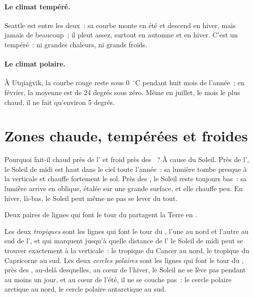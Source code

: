 \paragraph{Le climat tempéré.} Seattle est entre les deux~: sa courbe monte
en été et descend en hiver, mais jamais de beaucoup~; il pleut assez,
surtout en automne et en hiver. C'est un  tempéré~: ni grandes
chaleurs, ni grands froids.

\paragraph{Le climat polaire.} À Utqiaġvik, la courbe rouge reste sous
0~$^\circ$C pendant huit mois de l'année~; en février, la moyenne est de
24 degrés sous zéro. Même en juillet, le mois le plus chaud, il ne fait
qu'environ 5 degrés.

\section{Zones chaude, tempérées et froides}

Pourquoi fait-il chaud près de l' et froid près des ~? À cause
du Soleil. Près de l', le Soleil de midi est haut dans le ciel
toute l'année~: sa lumière tombe presque à la verticale et chauffe
fortement le sol. Près des , le Soleil reste toujours bas~: sa lumière
arrive en oblique, étalée sur une grande surface, et elle chauffe peu. En
hiver, là-bas, le Soleil peut même ne pas se lever du tout.

Deux paires de lignes qui font le tour du  partagent la Terre en .

\begin{definition}\label{def:g5:weather-and-climate:tropics}
Les deux \emph{tropiques} sont les lignes qui font le tour
du , l'une au nord et l'autre au sud de l', et qui marquent
jusqu'à quelle distance de l' le Soleil de midi peut se trouver
exactement à la verticale~: le tropique du Cancer au nord, le tropique du
Capricorne au sud. Les deux
\emph{cercles polaires} sont les lignes qui font le
tour du , près des , au-delà desquelles, au cœur de l'hiver, le
Soleil ne se lève pas pendant au moins un jour, et au cœur de l'été, il ne
se couche pas~: le cercle polaire arctique au nord, le cercle polaire
antarctique au sud.
\end{definition}

